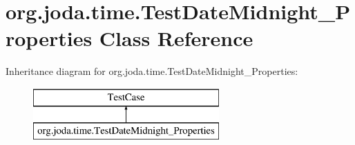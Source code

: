 \hypertarget{classorg_1_1joda_1_1time_1_1_test_date_midnight___properties}{\section{org.\-joda.\-time.\-Test\-Date\-Midnight\-\_\-\-Properties Class Reference}
\label{classorg_1_1joda_1_1time_1_1_test_date_midnight___properties}
}
Inheritance diagram for org.\-joda.\-time.\-Test\-Date\-Midnight\-\_\-\-Properties\-:\begin{figure}[H]
\begin{center}
\leavevmode
\includegraphics[height=2.000000cm]{classorg_1_1joda_1_1time_1_1_test_date_midnight___properties}
\end{center}
\end{figure}
